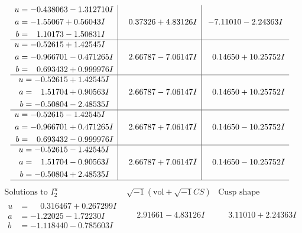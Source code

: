 \documentclass[1p]{elsarticle_modified}
\theoremstyle{definition}
\newcommand{\I}{\sqrt{-1}}
\begin{document}
$$\begin{array}{c|c|c}
\begin{aligned}
u &= -0.438063 - 1.312710 I \\
a &= -1.55067 + 0.56043 I \\
b &= \phantom{-}1.10173 - 1.50831 I\end{aligned}
 & \phantom{-}0.37326 + 4.83126 I & -7.11010 - 2.24363 I \\ \hline\begin{aligned}
u &= -0.52615 + 1.42545 I \\
a &= -0.966701 - 0.471265 I \\
b &= \phantom{-}0.693432 + 0.999976 I\end{aligned}
 & \phantom{-}2.66787 - 7.06147 I & \phantom{-}0.14650 + 10.25752 I \\ \hline\begin{aligned}
u &= -0.52615 + 1.42545 I \\
a &= \phantom{-}1.51704 + 0.90563 I \\
b &= -0.50804 - 2.48535 I\end{aligned}
 & \phantom{-}2.66787 - 7.06147 I & \phantom{-}0.14650 + 10.25752 I \\ \hline\begin{aligned}
u &= -0.52615 - 1.42545 I \\
a &= -0.966701 + 0.471265 I \\
b &= \phantom{-}0.693432 - 0.999976 I\end{aligned}
 & \phantom{-}2.66787 + 7.06147 I & \phantom{-}0.14650 - 10.25752 I \\ \hline\begin{aligned}
u &= -0.52615 - 1.42545 I \\
a &= \phantom{-}1.51704 - 0.90563 I \\
b &= -0.50804 + 2.48535 I\end{aligned}
 & \phantom{-}2.66787 + 7.06147 I & \phantom{-}0.14650 - 10.25752 I\\
 \hline 
 \end{array}$$\newpage$$\begin{array}{c|c|c}  
\text{Solutions to }I^u_{2}& \I (\text{vol} + \sqrt{-1}CS) & \text{Cusp shape}\\
 \hline 
\begin{aligned}
u &= \phantom{-}0.316467 + 0.267299 I \\
a &= -1.22025 - 1.72230 I \\
b &= -1.118440 - 0.785603 I\end{aligned}
 & \phantom{-}2.91661 - 4.83126 I & \phantom{-}3.11010 + 2.24363 I \\ \hline\begin{aligned}

\end{aligned}
\end{array}$$
\end{document}
